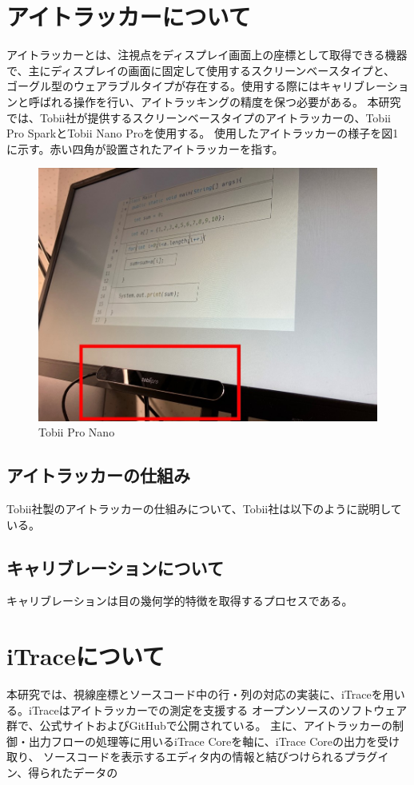 \documentclass[paper=a4paper,fontsize=11pt]{jlreq}
\begin{document}
  \section{アイトラッカーについて}
    アイトラッカーとは、注視点をディスプレイ画面上の座標として取得できる機器で、主にディスプレイの画面に固定して使用するスクリーンベースタイプと、
    ゴーグル型のウェアラブルタイプが存在する。使用する際にはキャリブレーションと呼ばれる操作を行い、アイトラッキングの精度を保つ必要がある。
    本研究では、Tobii社が提供するスクリーンベースタイプのアイトラッカーの、Tobii Pro Spark\cite{spark}とTobii Nano Pro\cite{nano}を使用する。
    使用したアイトラッカーの様子を図1に示す。赤い四角が設置されたアイトラッカーを指す。
    \begin{figure}[htbp]
      \centering
      \includegraphics[width=0.8\linewidth]{tobii_nano.jpg}
      \caption{Tobii Pro Nano}
    \end{figure}
    \FloatBarrier
  \clearpage

    \subsection{アイトラッカーの仕組み}
      Tobii社製のアイトラッカーの仕組みについて、Tobii社は以下のように説明している\cite{itracking_sikumi}。

    \subsection{キャリブレーションについて}
      キャリブレーションは目の幾何学的特徴を取得するプロセスである。
  \clearpage
    

  \section{iTraceについて}
    本研究では、視線座標とソースコード中の行・列の対応の実装に、iTrace\cite{itrace}を用いる。iTraceはアイトラッカーでの測定を支援する
    オープンソースのソフトウェア群で、公式サイトおよびGitHubで公開されている。
    主に、アイトラッカーの制御・出力フローの処理等に用いるiTrace Coreを軸に、iTrace Coreの出力を受け取り、
    ソースコードを表示するエディタ内の情報と結びつけられるプラグイン、得られたデータの
\end{document}
